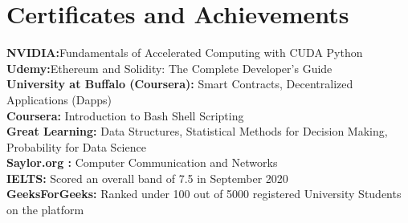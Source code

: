 \documentclass[letterpaper,11pt]{article}
\begin{document}
 \section{Certificates and Achievements}
 \begin{itemize}[leftmargin=0.15in, label={}]
    \small{\item{
     \textbf{NVIDIA:}{Fundamentals of Accelerated Computing with CUDA Python} \\
     \textbf{Udemy:}{Ethereum and Solidity: The Complete Developer's Guide} \\
     \textbf{University at Buffalo (Coursera):}{ Smart Contracts, Decentralized Applications (Dapps)} \\
     \textbf{Coursera:}{ Introduction to Bash Shell Scripting} \\
     \textbf{Great Learning:}{ Data Structures, Statistical Methods for Decision Making, Probability for Data Science} \\
     \textbf{Saylor.org :}{ Computer Communication and Networks} \\
     \textbf{IELTS: }{Scored an overall band of 7.5 in September 2020} \\
     \textbf{GeeksForGeeks: }{Ranked under 100 out of 5000 registered University Students on the platform}
    }}
 \end{itemize}



\end{document}

